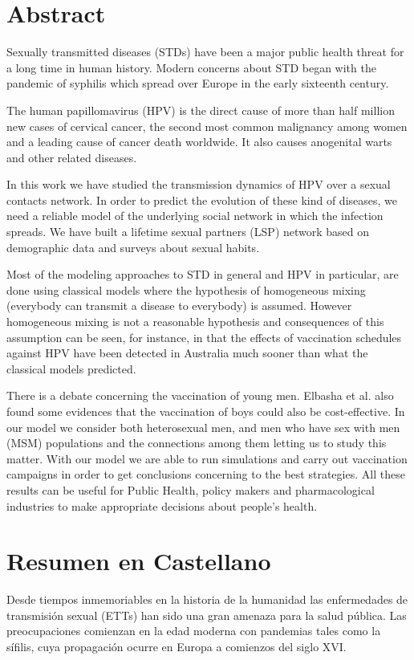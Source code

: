 
\chapter*{Abstract}
Sexually transmitted diseases (STDs) have been a major public health threat for a long time in human history. Modern concerns about STD began with the pandemic of syphilis which spread over Europe in the early sixteenth century. 

The human papillomavirus (HPV) is the direct cause of more than half million new cases of cervical cancer, the second most common malignancy among women and a leading cause of cancer death worldwide. It also causes anogenital warts and other related diseases.

In this work we have studied the transmission dynamics of HPV over a sexual contacts network. In order to predict the evolution of these kind of diseases, we need a reliable model of the underlying social network in which the infection spreads. We have built a lifetime sexual partners (LSP) network based on demographic data and surveys about sexual habits.

Most of the modeling approaches to STD in general and HPV in particular, are done using classical models where the hypothesis of homogeneous mixing (everybody can transmit a disease to everybody) is assumed. However homogeneous mixing is not a reasonable hypothesis and consequences of this assumption can be seen, for instance, in that the effects of vaccination schedules against HPV have been detected in Australia much sooner than what the classical models predicted. %

There is a debate concerning the vaccination of young men. Elbasha et al. also found some evidences that the vaccination of boys could also be cost-effective. In our model we consider both heterosexual men, and men who have sex with men (MSM) populations and the connections among them letting us to study this matter. With our model we are able to run simulations and carry out vaccination campaigns in order to get conclusions concerning to the best strategies. All these results can be useful for Public Health, policy makers and pharmacological industries to make appropriate decisions about people's health.

\chapter*{Resumen en Castellano}
Desde tiempos inmemoriables en la historia de la humanidad las enfermedades de transmisi\'on sexual (ETTs) han sido una gran amenaza para la salud p\'ublica. Las preocupaciones comienzan en la edad moderna con pandemias tales como la s\'ifilis, cuya propagaci\'on ocurre en Europa a comienzos del siglo XVI.

